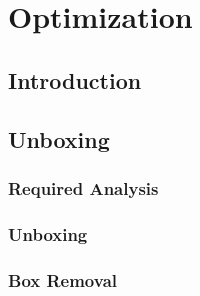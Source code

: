 \chapter{Optimization}
\section{Introduction}
\section{\Rift Unboxing}
\subsection{Required Analysis}
\subsection{Unboxing}
\subsection{Box Removal}
